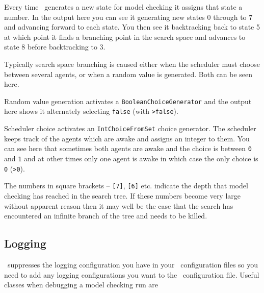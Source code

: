 Every time \jpf\ generates a new state for model checking it assigns that state a number.  In the output here you can see it generating new states 0 through to 7 and advancing forward to each state.  You then see it backtracking back to state 5 at which point it finds a branching point in the search space and advances to state 8 before backtracking to 3.

Typically search space branching is caused either when the scheduler must choose between several agents, or when a random value is generated.  Both can be seen here.

Random value generation activates a \texttt{BooleanChoiceGenerator} and the output here shows it alternately selecting  \texttt{false} (with \texttt{>false}).

Scheduler choice activates an \texttt{IntChoiceFromSet} choice generator.  The scheduler keeps track of the agents which are awake and assigns an integer to them.  You can see here that sometimes both agents are awake and the choice is between \texttt{0} and \texttt{1} and at other times only one agent is awake in which case the only choice is \texttt{0} (\texttt{>0}).

The numbers in square brackets -- \texttt{[7]}, \texttt{[6]} etc. indicate the depth that model checking has reached in the search tree.  If these numbers become very large without apparent reason then it may well be the case that the search has encountered an infinite branch of the tree and needs to be killed.

\subsection{Logging}
\jpf\ suppresses the logging configuration you have in your \ail\ configuration files so you need to add any logging configurations you want to the \jpf\ configuration file.  Useful classes when debugging a model checking run are

